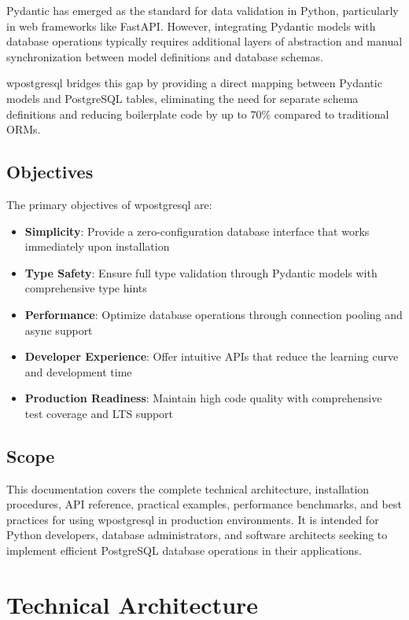 \documentclass[12pt,a4paper]{report}
\begin{document}
Pydantic has emerged as the standard for data validation in Python, particularly in web frameworks like FastAPI. However, integrating Pydantic models with database operations typically requires additional layers of abstraction and manual synchronization between model definitions and database schemas.

wpostgresql bridges this gap by providing a direct mapping between Pydantic models and PostgreSQL tables, eliminating the need for separate schema definitions and reducing boilerplate code by up to 70\% compared to traditional ORMs.

\section{Objectives}

The primary objectives of wpostgresql are:

\begin{itemize}
	\item \textbf{Simplicity}: Provide a zero-configuration database interface that works immediately upon installation
	\item \textbf{Type Safety}: Ensure full type validation through Pydantic models with comprehensive type hints
	\item \textbf{Performance}: Optimize database operations through connection pooling and async support
	\item \textbf{Developer Experience}: Offer intuitive APIs that reduce the learning curve and development time
	\item \textbf{Production Readiness}: Maintain high code quality with comprehensive test coverage and LTS support
\end{itemize}

\section{Scope}

This documentation covers the complete technical architecture, installation procedures, API reference, practical examples, performance benchmarks, and best practices for using wpostgresql in production environments. It is intended for Python developers, database administrators, and software architects seeking to implement efficient PostgreSQL database operations in their applications.

\chapter{Technical Architecture}
\end{document}
